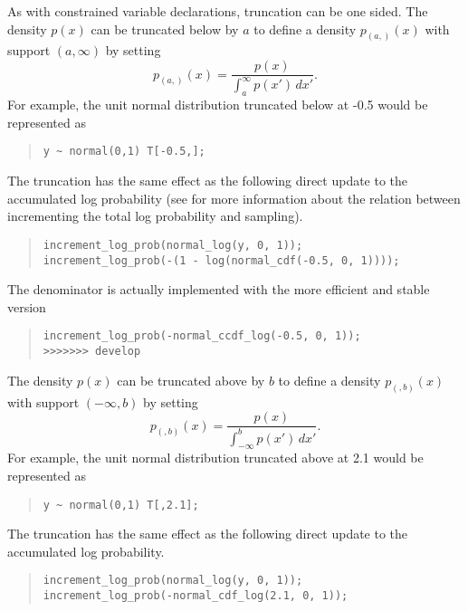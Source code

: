 As with constrained variable declarations, truncation can be one
sided.  The density $p(x)$ can be truncated below by $a$ to define a
density $p_{(a,)}(x)$ with support $(a,\infty)$ by setting
%
\[
p_{(a,)}(x) = \frac{p(x)}
                 {\int_a^{\infty} p(x') \, dx'}.
\]
For example, the unit normal distribution truncated below at -0.5 would
be represented as
%
\begin{quote}
\begin{Verbatim} 
y ~ normal(0,1) T[-0.5,];
\end{Verbatim}
\end{quote}
% 
The truncation has the same effect as the following direct update to
the accumulated log probability (see  for
more information about the relation between incrementing the total log
probability and sampling).
%
\begin{quote}
\begin{Verbatim}[fontsize=\small]
increment_log_prob(normal_log(y, 0, 1));
increment_log_prob(-(1 - log(normal_cdf(-0.5, 0, 1))));
\end{Verbatim}
\end{quote}
%
The denominator is actually implemented with the more efficient and
stable version
%
\begin{quote}
\begin{Verbatim}
increment_log_prob(-normal_ccdf_log(-0.5, 0, 1));
>>>>>>> develop
\end{Verbatim}
\end{quote}

The density $p(x)$ can be truncated above by $b$ to define a density
$p_{(,b)}(x)$ with support $(-\infty,b)$ by setting
\[
p_{(,b)}(x) = \frac{p(x)}
                    {\int_{-\infty}^b p(x') \, dx'}.
\]
For example, the unit normal distribution truncated above at 2.1 would
be represented as
%
\begin{quote}
\begin{Verbatim} 
y ~ normal(0,1) T[,2.1];
\end{Verbatim}
\end{quote}
% 
The truncation has the same effect as the following direct update to
the accumulated log probability.
%
\begin{quote}
\begin{Verbatim}[fontsize=\small]
increment_log_prob(normal_log(y, 0, 1));
increment_log_prob(-normal_cdf_log(2.1, 0, 1));
\end{Verbatim}
\end{quote}

